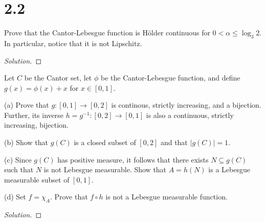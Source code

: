 \documentclass[10pt]{article}
\newenvironment{problem}[2][Problem]{\begin{trivlist}
\item[\hskip \labelsep {\bfseries #1}\hskip \labelsep {\bfseries #2.}]}{\end{trivlist}}
\begin{document}
\section*{2.2}

\begin{problem}{5.1.5}

Prove that the Cantor-Lebesgue function is H\"older continuous for $0 < \alpha \leq \log_3 2$. In particular, notice that it is not Lipschitz.

\end{problem}
\begin{proof}[Solution]

\end{proof}

\begin{problem}{5.1.7}

Let $C$ be the Cantor set, let $\phi$ be the Cantor-Lebesgue function, and define $g(x) = \phi(x) + x$ for $x \in [0,1]$.

(a) Prove that $g: [0,1] \to [0,2]$ is continous, strictly increasing, and a bijection. Further, its inverse $h = g^{-1}: [0,2] \to [0,1]$ is also a continuous, strictly increasing, bijection.

(b) Show that $g(C)$ is a closed subset of $[0,2]$ and that $|g(C)| = 1$.

(c) Since $g(C)$ has positive measure, it follows that there exists $N \subseteq g(C)$ such that $N$ is not Lebesgue measurable. Show that $A = h(N)$ is a Lebesgue measurable subset of $[0,1]$.

(d) Set $f = \chi_A$. Prove that $f \circ h$ is not a Lebesgue measurable function.

\end{problem}
\begin{proof}[Solution]


\end{proof}

 
\end{document}
